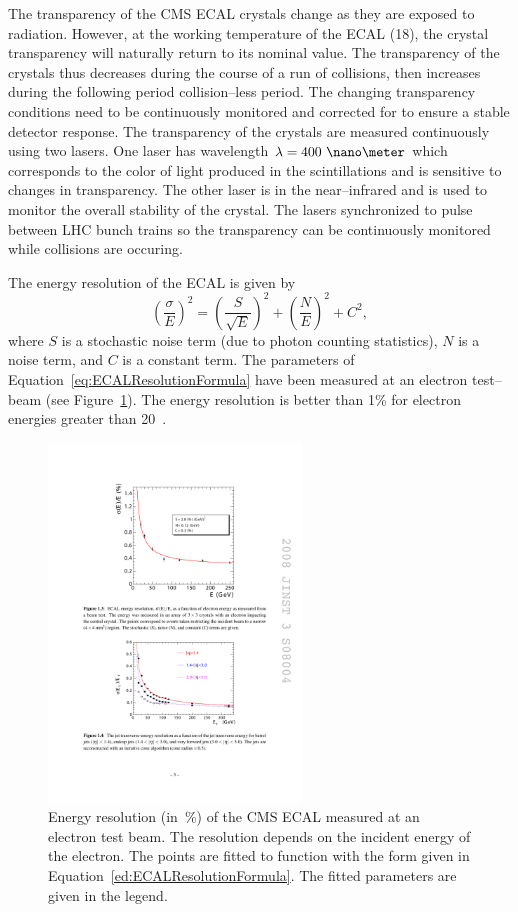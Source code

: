 The transparency of the CMS ECAL crystals change as they are exposed to
radiation.  However, at the working temperature of the ECAL (18\celsius), the
crystal transparency will naturally return to its nominal value.  The
transparency of the crystals thus decreases during the course of a run of
collisions, then increases during the following period collision--less period.
The changing transparency conditions need to be continuously monitored and
corrected for to ensure a stable detector response.  The transparency of the
crystals are measured continuously using two lasers. One laser has wavelength
$\lambda = 400~\nano\meter$ which corresponds to the color of light produced in
the scintillations and is sensitive to changes in transparency.  The other laser
is in the near--infrared and is used to monitor the overall stability of the
crystal.  The lasers synchronized to pulse between LHC bunch trains so the
transparency can be continuously monitored while collisions are occuring.

The energy resolution of the ECAL is given by
\begin{equation}
  \left(\frac{\sigma}{E}\right)^2 = \left(\frac{S}{\sqrt E}\right)^2 + 
  \left(\frac{N}{E}\right)^2 + C^2,
  \label{eq:ECALResolutionFormula}
\end{equation}
where $S$ is a stochastic noise term (due to photon counting statistics), $N$ is
a noise term, and $C$ is a constant term.  The parameters of
Equation~\ref{eq:ECALResolutionFormula} have been measured at an electron
test--beam (see Figure~\ref{fig:ECALResolution}).  The energy resolution is
better than 1\% for electron energies greater than 20~\GeV.  
\begin{figure}
  \centering
  \includegraphics[width=0.6\textwidth]{detector_chapter/figures/ECAL_Energy_resolution.pdf}
  \caption[Energy resolution of the CMS ECAL]{Energy resolution (in~\%) of the
  CMS ECAL measured at an electron test beam.  The resolution depends on the
  incident energy of the electron.  The points are fitted to function with the
  form given in Equation~\ref{ed:ECALResolutionFormula}.  The fitted parameters
  are given in the legend.}
  \label{fig:ECALResolution}
\end{figure}

